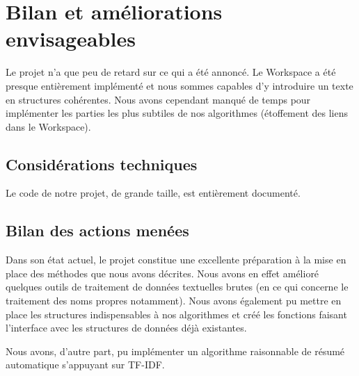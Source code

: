 \documentclass[a4paper, 12pt]{article}
\begin{document}
\section{Bilan et améliorations envisageables}


Le projet n'a que peu de retard sur ce qui a été annoncé. Le Workspace a été presque entièrement implémenté et nous sommes capables d'y introduire un texte en structures cohérentes. Nous avons cependant manqué de temps pour implémenter les parties les plus subtiles de nos algorithmes (étoffement des liens dans le Workspace).

\subsection{Considérations techniques}

Le code de notre projet, de grande taille, est entièrement documenté.

\subsection{Bilan des actions menées}

Dans son état actuel, le projet constitue une excellente préparation à la mise en place des méthodes que nous avons décrites. Nous avons en effet amélioré quelques outils de traitement de données textuelles brutes (en ce qui concerne le traitement des noms propres notamment). Nous avons également pu mettre en place les structures indispensables à nos algorithmes et créé les fonctions faisant l'interface avec les structures de données déjà existantes.

Nous avons, d'autre part, pu implémenter un algorithme raisonnable de résumé automatique s'appuyant sur TF-IDF. %



\vspace{1\baselineskip}


\end{document}
